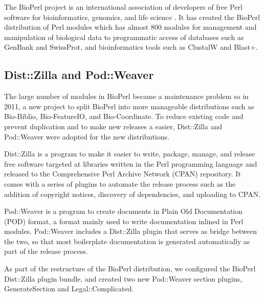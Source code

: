 The BioPerl project is an international association of developers of
free Perl software for bioinformatics, genomics, and life science
\citep{bioperl}.  It has created the BioPerl distribution of Perl
modules which has almost 800 modules for management and manipulation
of biological data to programmatic access of databases such as GenBank
and SwissProt, and bioinformatics tools such as ClustalW and Blast+.


\subsection{Dist::Zilla and Pod::Weaver}

The large number of modules in BioPerl became a maintenance problem
so in 2011, a new project to split BioPerl into
more manageable distributions such as Bio-Biblio, Bio-FeatureIO, and
Bio-Coordinate.  To reduce existing code and prevent duplication
and to make new releases
a easier, Dist::Zilla and Pod::Weaver were adopted for
the new distributions.

Dist::Zilla is a program to make it easier to write, package, manage,
and release free software targeted at libraries written in the Perl
programming language and released to the Comprehensive Perl Archive
Network (CPAN) repository.  It comes with a series of plugins to automate the
release process such as the addition of copyright notices, discovery
of dependencies, and uploading to CPAN.

Pod::Weaver is a program to create documents in Plain Old
Documentation (POD) format, a format mainly used to write
documentation inlined in Perl modules.
Pod::Weaver includes a Dist::Zilla plugin
that serves as bridge between the two, so that most boilerplate documentation is
generated automatically as part of the release process.

As part of the restructure of the BioPerl distribution, we configured
the BioPerl Dist::Zilla plugin bundle, and created two new Pod::Weaver
section plugins, GenerateSection and Legal::Complicated.

